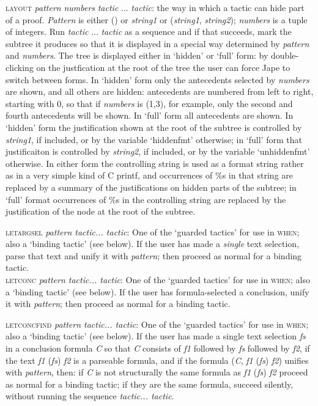 \textsc{layout} \textit{pattern} \textit{numbers} \textit{tactic} ... \textit{tactic}: the way in which a tactic can hide part of a proof. \textit{Pattern} is either () or \textit{string1} or (\textit{string1}, \textit{string2}); \textit{numbers} is a tuple of integers. Run \textit{tactic} ... \textit{tactic} as a sequence and if that succeeds, mark the subtree it produces so that it is displayed in a special way determined by \textit{pattern} and \textit{numbers}. The tree is displayed either in `hidden' or `full' form: by double-clicking on the justfication at the root of the tree the user can force Jape to switch between forms. In `hidden' form only the antecedents selected by \textit{numbers} are shown, and all others are hidden: antecedents are numbered from left to right, starting with 0, so that if \textit{numbers} is (1,3), for example, only the second and fourth antecedents will be shown. In `full' form all antecedents are shown. In `hidden' form the justification shown at the root of the subtree is controlled by \textit{string1}, if included, or by the variable `hiddenfmt' otherwise; in `full' form that justificaiton is controlled by \textit{string2}, if included, or by the variable `unhiddenfmt' otherwise. In either form the controlling string is used as a format string rather as in a very simple kind of C printf, and occurrences of \%s in that string are replaced by a summary of the justifications on hidden parts of the subtree; in `full' format occurrences of \%s in the controlling string are replaced by the justification of the node at the root of the subtree.


\textsc{letargsel} \textit{pattern tactic... tactic}: One of the `guarded tactics' for use in \textsc{when}; also a `binding tactic' (see below). If the user has made a \textit{single} text selection, parse that text and unify it with \textit{pattern}; then proceed as normal for a binding tactic.\\
\textsc{letconc} \textit{pattern tactic... tactic}: One of the `guarded tactics' for use in \textsc{when}; also a `binding tactic' (see below). If the user has formula-selected a conclusion, unify it with \textit{pattern}; then proceed as normal for a binding tactic.


\textsc{letconcfind} \textit{pattern tactic... tactic}: One of the `guarded tactics' for use in \textsc{when}; also a `binding tactic' (see below). If the user has made a single text selection \textit{fs} in a conclusion formula \textit{C} so that \textit{C} consists of \textit{f1} followed by \textit{fs} followed by \textit{f2}, if the text \textit{f1} (\textit{fs}) \textit{f2} is a parseable formula, and if the formula (\textit{C}, \textit{f1} (\textit{fs}) \textit{f2}) unifies with \textit{pattern}, then: if \textit{C} is not structurally the same formula as \textit{f1} (\textit{fs}) \textit{f2} proceed as normal for a binding tactic; if they are the same formula, succeed silently, without running the sequence \textit{tactic... tactic}.


